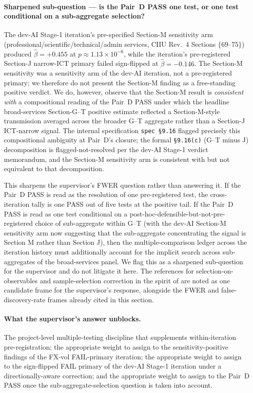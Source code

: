 \paragraph{Sharpened sub-question --- is the Pair~D PASS one test, or one
test conditional on a sub-aggregate selection?} The dev-AI Stage-1
iteration's pre-specified Section-M sensitivity arm
(professional/scientific/technical/admin services, CIIU Rev.~4 Sections
\(\{69\text{--}75\}\)) produced \(\hat{\beta} = +0.455\) at
\(p \approx 1.13 \times 10^{-6}\), while the iteration's pre-registered
Section-J narrow-ICT primary failed sign-flipped at
\(\hat{\beta} = -0.146\). The Section-M sensitivity was a sensitivity
arm of the dev-AI iteration, not a pre-registered primary; we therefore
do not present the Section-M finding as a free-standing positive
verdict. We do, however, observe that the Section-M result is
\emph{consistent with} a compositional reading of the Pair~D PASS under
which the headline broad-services Section-G--T positive estimate
reflected a Section-M-style transmission averaged across the broader
G--T aggregate rather than a Section-J ICT-narrow signal. The internal
specification \texttt{spec~\S 9.16} flagged precisely this compositional
ambiguity at Pair~D's closure; the formal \texttt{\S 9.16(c)} (G--T
minus J) decomposition is flagged-not-resolved per the dev-AI Stage-1
verdict memorandum, and the Section-M sensitivity arm is consistent with
but not equivalent to that decomposition.

This sharpens the supervisor's FWER question rather than answering it.
If the Pair~D PASS is read as the resolution of one pre-registered test,
the cross-iteration tally is one PASS out of five tests at the positive
tail. If the Pair~D PASS is read as one test conditional on a
post-hoc-defensible-but-not-pre-registered choice of sub-aggregate
within G--T (with the dev-AI Section-M sensitivity arm now suggesting
that the sub-aggregate concentrating the signal is Section M rather
than Section J), then the multiple-comparison ledger across the
iteration history must additionally account for the implicit search
across sub-aggregates of the broad-services panel. We flag this as a
sharpened sub-question for the supervisor and do not litigate it here.
The references for selection-on-observables and sample-selection
correction in the spirit of \citet{heckman_1979} are noted as one
candidate frame for the supervisor's response, alongside the FWER and
false-discovery-rate frames already cited in this section.

\paragraph{What the supervisor's answer unblocks.} The project-level
multiple-testing discipline that supplements within-iteration
pre-registration; the appropriate weight to assign to the
sensitivity-positive findings of the FX-vol FAIL-primary iteration; the
appropriate weight to assign to the sign-flipped FAIL primary of the
dev-AI Stage-1 iteration under a directionally-aware correction; and
the appropriate weight to assign to the Pair~D PASS once the
sub-aggregate-selection question is taken into account.
